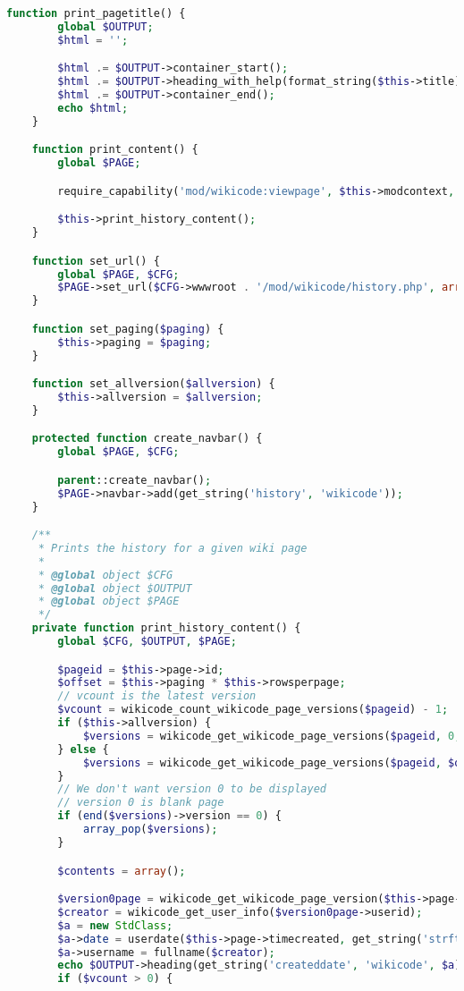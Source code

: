 \begin{lstlisting}[language=PHP]
    function print_pagetitle() {
        global $OUTPUT;
        $html = '';

        $html .= $OUTPUT->container_start();
        $html .= $OUTPUT->heading_with_help(format_string($this->title), 'history', 'wikicode');
        $html .= $OUTPUT->container_end();
        echo $html;
    }

    function print_content() {
        global $PAGE;

        require_capability('mod/wikicode:viewpage', $this->modcontext, NULL, true, 'noviewpagepermission', 'wikicode');

        $this->print_history_content();
    }

    function set_url() {
        global $PAGE, $CFG;
        $PAGE->set_url($CFG->wwwroot . '/mod/wikicode/history.php', array('pageid' => $this->page->id));
    }

    function set_paging($paging) {
        $this->paging = $paging;
    }

    function set_allversion($allversion) {
        $this->allversion = $allversion;
    }

    protected function create_navbar() {
        global $PAGE, $CFG;

        parent::create_navbar();
        $PAGE->navbar->add(get_string('history', 'wikicode'));
    }

    /**
     * Prints the history for a given wiki page
     *
     * @global object $CFG
     * @global object $OUTPUT
     * @global object $PAGE
     */
    private function print_history_content() {
        global $CFG, $OUTPUT, $PAGE;

        $pageid = $this->page->id;
        $offset = $this->paging * $this->rowsperpage;
        // vcount is the latest version
        $vcount = wikicode_count_wikicode_page_versions($pageid) - 1;
        if ($this->allversion) {
            $versions = wikicode_get_wikicode_page_versions($pageid, 0, $vcount);
        } else {
            $versions = wikicode_get_wikicode_page_versions($pageid, $offset, $this->rowsperpage);
        }
        // We don't want version 0 to be displayed
        // version 0 is blank page
        if (end($versions)->version == 0) {
            array_pop($versions);
        }

        $contents = array();

        $version0page = wikicode_get_wikicode_page_version($this->page->id, 0);
        $creator = wikicode_get_user_info($version0page->userid);
        $a = new StdClass;
        $a->date = userdate($this->page->timecreated, get_string('strftimedaydatetime', 'langconfig'));
        $a->username = fullname($creator);
        echo $OUTPUT->heading(get_string('createddate', 'wikicode', $a), 4, 'wikicode_headingtime');
        if ($vcount > 0) {


\end{lstlisting}
